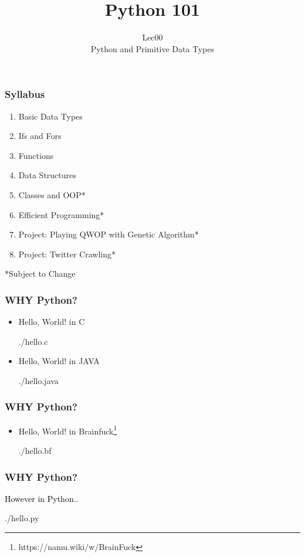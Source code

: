 \documentclass{beamer}
\title{Python 101}
\subtitle{Lec00 \\ Python and Primitive Data Types}
\begin{document}
\frame{\titlepage}
\begin{frame}
\frametitle{Syllabus}
\begin{enumerate}
  \item Basic Data Types
  \item Ifs and Fors
  \item Functions
  \item Data Structures
  \item Classes and OOP*
  \item Efficient Programming*
  \item Project: Playing QWOP with Genetic Algorithm*
  \item Project: Twitter Crawling*
\end{enumerate}
*Subject to Change
\end{frame}

\begin{frame}
\frametitle{WHY Python?}
\begin{itemize}
    \item
    Hello, World! in C
    \begin{lstinputlisting}
      {./hello.c}
    \end{lstinputlisting}
    \item
    Hello, World! in JAVA
    \begin{lstinputlisting}
      {./hello.java}
    \end{lstinputlisting}
\end{itemize}
\end{frame}

\begin{frame}
\frametitle{WHY Python?}
\begin{itemize}
    \item
      Hello, World! in
      Brainfuck\footnote{\footnotesize{https://namu.wiki/w/BrainFuck}}
    \begin{lstinputlisting}
      {./hello.bf}
    \end{lstinputlisting}
\end{itemize}
\end{frame}

\begin{frame}
\frametitle{WHY Python?}
  \textcolor{black}{\LARGE{However in Python..}}
\end{frame}

\begin{frame}
    \begin{lstinputlisting}
      {./hello.py}
    \end{lstinputlisting}
\end{frame}
\end{document}
